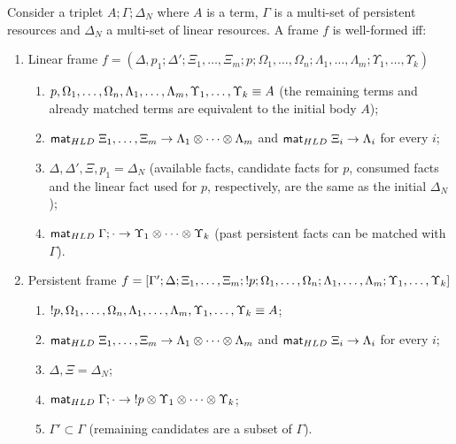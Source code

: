 \begin{definition}

Consider a triplet $A; \Gamma; \Delta_{N}$ where $A$ is a term, $\Gamma$ is a
multi-set of persistent resources and $\Delta_{N}$ a multi-set of linear
resources. A frame $f$ is well-formed iff:

\begin{enumerate}[leftmargin=*]
   \item Linear frame $f = (\Delta, p_1; \Delta'; \Xi_1, \dotsc, \Xi_m; p;
         \Omega_1, \dotsc, \Omega_n; \Lambda_1, \dotsc, \Lambda_m; \Upsilon_1,
         \dotsc, \Upsilon_k)$

   \begin{enumerate}
      \item $p, \Omega_1, \dotsc, \Omega_n, \Lambda_1, \dotsc, \Lambda_m,
         \Upsilon_1, \dotsc, \Upsilon_k \equiv A$ (the remaining terms and already
               matched terms are equivalent to the initial body $A$);
      \item $\mathsf{mat}_{HLD} \; \Xi_1, \dotsc, \Xi_m \rightarrow \Lambda_1 \otimes \dotsb \otimes
      \Lambda_m$ and $\mathsf{mat}_{HLD} \; \Xi_i \rightarrow \Lambda_i$ for every $i$;

      \item $\Delta, \Delta', \Xi, p_1 = \Delta_{N}$ (available facts, candidate
            facts for $p$, consumed facts and the linear fact used for $p$,
            respectively, are the same as the initial $\Delta_{N}$);

      \item $\mathsf{mat}_{HLD} \; \Gamma; \cdot \rightarrow \Upsilon_1 \otimes \dotsb \otimes
      \Upsilon_k$ (past persistent facts can be matched with $\Gamma$).

   \end{enumerate}
   \item Persistent frame $f = [\Gamma'; \Delta; \Xi_1, \dotsc, \Xi_m; {!} p;
         \Omega_1, \dotsc, \Omega_n; \Lambda_1, \dotsc, \Lambda_m; \Upsilon_1,
         \dotsc, \Upsilon_k]$

      \begin{enumerate}
         \item ${!} p, \Omega_1, \dotsc, \Omega_n, \Lambda_1, \dotsc,
                     \Lambda_m, \Upsilon_1, \dotsc, \Upsilon_k \equiv A$;
         \item $\mathsf{mat}_{HLD} \; \Xi_1, \dots, \Xi_m \rightarrow \Lambda_1 \otimes \dotsb \otimes
                     \Lambda_m$ and $\mathsf{mat}_{HLD} \; \Xi_i \rightarrow \Lambda_i$ for every $i$;
         \item $\Delta, \Xi = \Delta_{N}$;
         \item $\mathsf{mat}_{HLD} \; \Gamma; \cdot \rightarrow {!} p \otimes \Upsilon_1 \otimes
                     \dotsb \otimes \Upsilon_k$;
         \item $\Gamma' \subset \Gamma$ (remaining candidates are a subset of
                     $\Gamma$).
      \end{enumerate}
\end{enumerate}
\end{definition}


